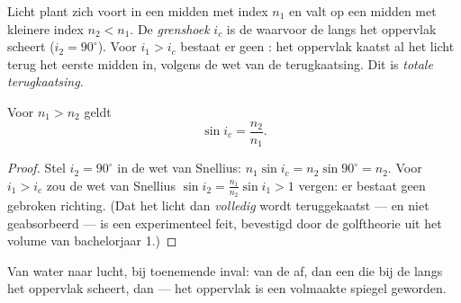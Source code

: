 \begin{definition}\label{def:g10:refraction:critical}
Licht plant zich voort in een midden met index $n_1$ en valt op een
midden met kleinere index $n_2 < n_1$. De \emph{grenshoek}
$i_c$ is de  waarvoor de  langs het oppervlak
scheert ($i_2 = 90^\circ$). Voor $i_1 > i_c$ bestaat er geen : het oppervlak kaatst al het licht terug het eerste midden in,
volgens de wet van de terugkaatsing. Dit is \emph{totale
terugkaatsing}.
\end{definition}

\begin{proposition}\label{prop:g10:refraction:criticalformula}
Voor $n_1 > n_2$ geldt
\[
\sin i_c = \frac{n_2}{n_1} .
\]
\end{proposition}

\begin{proof}
Stel $i_2 = 90^\circ$ in de wet van Snellius: $n_1 \sin i_c =
n_2 \sin 90^\circ = n_2$. Voor $i_1 > i_c$ zou de wet van Snellius
$\sin i_2 = \frac{n_1}{n_2}\sin i_1 > 1$ vergen: er bestaat geen gebroken
richting. (Dat het licht dan \emph{volledig} wordt teruggekaatst --- en
niet geabsorbeerd --- is een experimenteel feit, bevestigd door de
golftheorie uit het volume van bachelorjaar 1.)
\end{proof}

\begin{omfigure}

{\small Van water naar lucht, bij toenemende inval:  van de
 af, dan een  die bij de  langs het
oppervlak scheert, dan  --- het oppervlak is een
volmaakte spiegel geworden.}
\end{omfigure}

